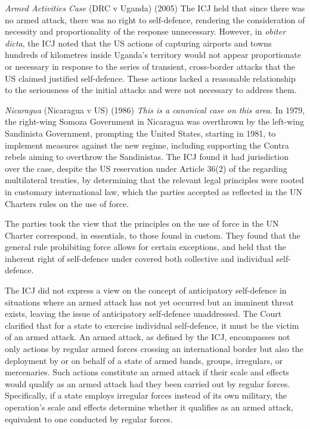 \begin{casedetails}{\textit{Armed Activities Case} (DRC v Uganda) (2005)}
    \flushleft
    The ICJ held that since there was no armed attack, there was no right to self-defence, rendering the consideration of necessity and proportionality of the response unnecessary. However, in \textit{obiter dicta}, the ICJ noted that the US actions of capturing airports and towns hundreds of kilometres inside Uganda's territory would not appear proportionate or necessary in response to the series of transient, cross-border attacks that the US claimed justified self-defence. These actions lacked a reasonable relationship to the seriousness of the initial attacks and were not necessary to address them.
\end{casedetails}

\begin{casedetails}{\textit{Nicaragua} (Nicaragua v US) (1986)}
    \flushleft
    \textit{This is a canonical case on this area.}
    In 1979, the right-wing Somoza Government in Nicaragua was overthrown by the left-wing Sandinista Government, prompting the United States, starting in 1981, to implement measures against the new regime, including supporting the Contra rebels aiming to overthrow the Sandinistas. The ICJ found it had jurisdiction over the case, despite the US reservation under Article 36(2) of the  regarding multilateral treaties, by determining that the relevant legal principles were rooted in customary international law, which the parties accepted as reflected in the UN Charters rules on the use of force.

    The parties took the view that the principles on the use of force in the UN Charter correspond, in essentials, to those found in custom. They found that the general rule prohibiting force allows for certain exceptions, and held that the inherent right of self-defence under  covered both collective and individual self-defence.


    The ICJ did not express a view on the concept of anticipatory self-defence in situations where an armed attack has not yet occurred but an imminent threat exists, leaving the issue of anticipatory self-defence unaddressed. The Court clarified that for a state to exercise individual self-defence, it must be the victim of an armed attack. An armed attack, as defined by the ICJ, encompasses not only actions by regular armed forces crossing an international border but also the deployment by or on behalf of a state of armed bands, groups, irregulars, or mercenaries. Such actions constitute an armed attack if their scale and effects would qualify as an armed attack had they been carried out by regular forces. Specifically, if a state employs irregular forces instead of its own military, the operation's scale and effects determine whether it qualifies as an armed attack, equivalent to one conducted by regular forces.


\end{casedetails}
